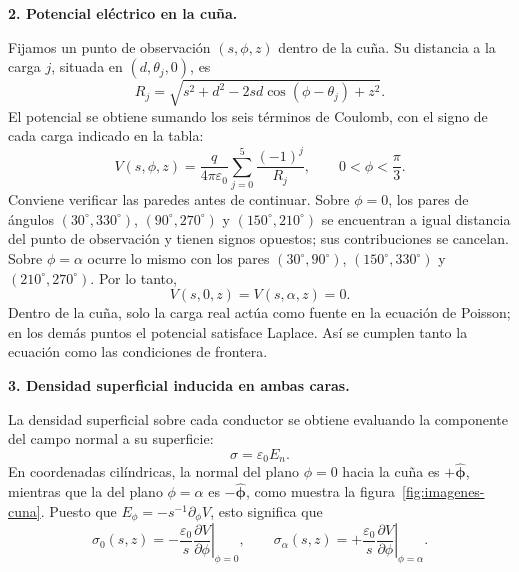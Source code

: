 \documentclass[11pt,a4paper]{article}
\begin{document}
\textbf{2. Potencial eléctrico en la cuña.}\par
Fijamos un punto de observación $(s,\phi,z)$ dentro de la cuña. Su
distancia a la carga $j$, situada en $(d,\theta_j,0)$, es
\[
R_j=\sqrt{s^2+d^2-2sd\cos(\phi-\theta_j)+z^2}.
\]
El potencial se obtiene sumando los seis términos de Coulomb, con el
signo de cada carga indicado en la tabla:
\begin{equation}
\boxed{\displaystyle
V(s,\phi,z)=\frac{q}{4\pi\varepsilon_0}
\sum_{j=0}^{5}\frac{(-1)^j}{R_j},
\qquad 0<\phi<\frac{\pi}{3}.}
\label{eq:potential}
\end{equation}
Conviene verificar las paredes antes de continuar. Sobre $\phi=0$, los
pares de ángulos $(30^\circ,330^\circ)$, $(90^\circ,270^\circ)$ y
$(150^\circ,210^\circ)$ se encuentran a igual distancia del punto de
observación y tienen signos opuestos; sus contribuciones se cancelan.
Sobre $\phi=\alpha$ ocurre lo mismo con los pares
$(30^\circ,90^\circ)$, $(150^\circ,330^\circ)$ y
$(210^\circ,270^\circ)$. Por lo tanto,
\[
V(s,0,z)=V(s,\alpha,z)=0.
\]
Dentro de la cuña, solo la carga real actúa como fuente en la ecuación de
Poisson; en los demás puntos el potencial satisface Laplace. Así se cumplen
tanto la ecuación como las condiciones de frontera.

\textbf{3. Densidad superficial inducida en ambas caras.}\par
La densidad superficial sobre cada conductor se obtiene evaluando la
componente del campo normal a su superficie:
\[
\sigma=\varepsilon_0 E_n.
\]
En coordenadas cilíndricas, la normal del plano $\phi=0$ hacia la cuña
es $+\hat{\boldsymbol\phi}$, mientras que la del plano $\phi=\alpha$
es $-\hat{\boldsymbol\phi}$, como muestra la figura~\ref{fig:imagenes-cuna}.
Puesto que $E_\phi=-s^{-1}\partial_\phi V$, esto significa que
\[
\sigma_0(s,z)=-\left.\frac{\varepsilon_0}{s}
\frac{\partial V}{\partial\phi}\right|_{\phi=0},
\qquad
\sigma_\alpha(s,z)=+\left.\frac{\varepsilon_0}{s}
\frac{\partial V}{\partial\phi}\right|_{\phi=\alpha}.
\]
\end{document}
